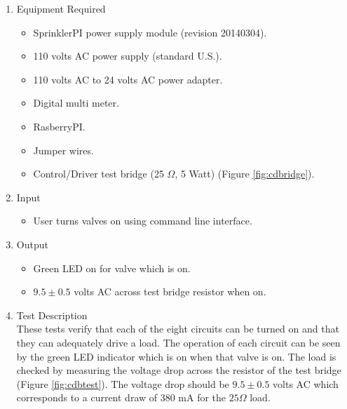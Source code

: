 \documentclass{article}
\begin{document}
\begin{enumerate}
\item Equipment Required
	\begin{itemize}
	\item SprinklerPI power supply module (revision 20140304).
	\item 110 volts AC power supply (standard U.S.).
	\item 110 volts AC to 24 volts AC power adapter.
	\item Digital multi meter.
	\item RasberryPI.
	\item Jumper wires.
	\item Control/Driver test bridge (25 $\Omega$, 5 Watt)
			(Figure \ref{fig:cdbridge}).
	\end{itemize}
\item Input
	\begin{itemize}
	\item User turns valves on using command line interface.
	\end{itemize}
\pagebreak
\item Output
	\begin{itemize}
	\item Green LED on for valve which is on.
	\item $9.5\pm0.5$ volts AC across test bridge resistor when on.
	\end{itemize}
\item Test Description \\

These tests verify that each of the eight circuits can be turned
on and that they can adequately drive a load.
The operation of each circuit can be seen by the green LED indicator
which is on when that valve is on.
The load is checked by measuring the voltage drop across the
resistor of the test bridge (Figure \ref{fig:cdbtest}).
The voltage drop should be $9.5\pm0.5$ volts AC which corresponds
to a current draw of $380$ mA for the $25 \Omega$ load.


\end{enumerate}
\end{document}
